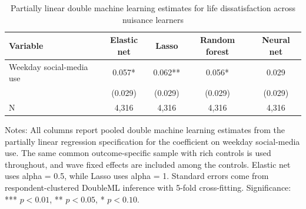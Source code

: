 \begin{table}[!htbp]
\centering
\caption{Partially linear double machine learning estimates for life dissatisfaction across nuisance learners}
\label{tab:dml_life_methods}
\begin{tabular}{lcccc}
\hline
Variable & Elastic net & Lasso & Random forest & Neural net
\\
\hline
Weekday social-media use & 0.057* & 0.062** & 0.056* & 0.029
\\
 & (0.029) & (0.029) & (0.029) & (0.029)
\\
N & 4,316 & 4,316 & 4,316 & 4,316
\\
\hline
\end{tabular}
\begin{minipage}{0.95\textwidth}
\footnotesize Notes: All columns report pooled double machine learning estimates from the partially linear regression specification for the coefficient on weekday social-media use. The same common outcome-specific sample with rich controls is used throughout, and wave fixed effects are included among the controls. Elastic net uses alpha = 0.5, while Lasso uses alpha = 1. Standard errors come from respondent-clustered DoubleML inference with 5-fold cross-fitting. Significance: *** \(p < 0.01\), ** \(p < 0.05\), * \(p < 0.10\).
\end{minipage}
\end{table}
